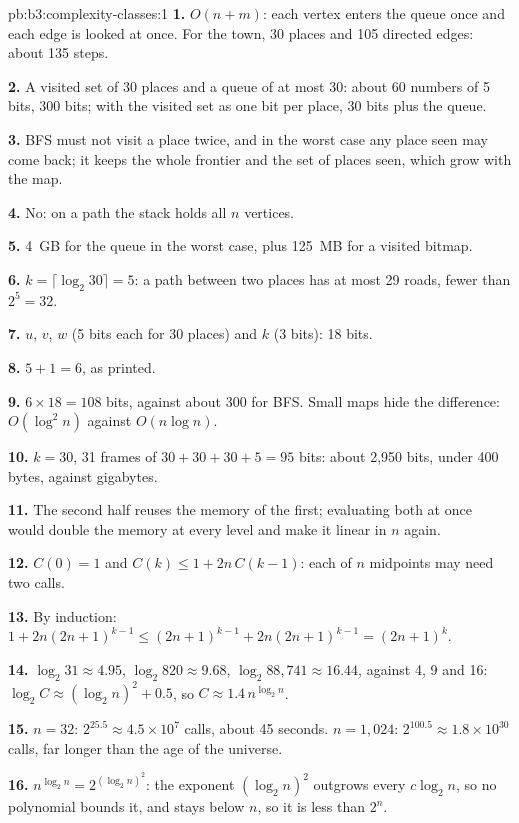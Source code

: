 \begin{solution}{pb:b3:complexity-classes:1}
\textbf{1.} $O(n + m)$: each vertex enters the queue once and each edge is looked at once. For the town, 30 places and 105 directed edges: about 135 steps.

\textbf{2.} A visited set of 30 places and a queue of at most 30: about 60 numbers of 5 bits, 300 bits; with the visited set as one bit per place, 30 bits plus the queue.

\textbf{3.} BFS must not visit a place twice, and in the worst case any place seen may come back; it keeps the whole frontier and the set of places seen, which grow with the map.

\textbf{4.} No: on a path the stack holds all $n$ vertices.

\textbf{5.} 4~GB for the queue in the worst case, plus 125~MB for a visited bitmap.

\textbf{6.} $k = \lceil \log_2 30 \rceil = 5$: a path between two places has at most 29 roads, fewer than $2^5 = 32$.

\textbf{7.} $u$, $v$, $w$ (5 bits each for 30 places) and $k$ (3 bits): 18 bits.

\textbf{8.} $5 + 1 = 6$, as printed.

\textbf{9.} $6 \times 18 = 108$ bits, against about 300 for BFS. Small maps hide the difference: $O(\log^2 n)$ against $O(n \log n)$.

\textbf{10.} $k = 30$, 31 frames of $30 + 30 + 30 + 5 = 95$ bits: about 2,950 bits, under 400 bytes, against gigabytes.

\textbf{11.} The second half reuses the memory of the first; evaluating both at once would double the memory at every level and make it linear in $n$ again.

\textbf{12.} $C(0) = 1$ and $C(k) \le 1 + 2n\,C(k - 1)$: each of $n$ midpoints may need two calls.

\textbf{13.} By induction: $1 + 2n(2n + 1)^{k - 1} \le (2n + 1)^{k - 1} + 2n(2n + 1)^{k - 1} = (2n + 1)^k$.

\textbf{14.} $\log_2 31 \approx 4.95$, $\log_2 820 \approx 9.68$, $\log_2 88{,}741 \approx 16.44$, against 4, 9 and 16: $\log_2 C \approx (\log_2 n)^2 + 0.5$, so $C \approx 1.4 \, n^{\log_2 n}$.

\textbf{15.} $n = 32$: $2^{25.5} \approx 4.5 \times 10^7$ calls, about 45 seconds. $n = 1{,}024$: $2^{100.5} \approx 1.8 \times 10^{30}$ calls, far longer than the age of the universe.

\textbf{16.} $n^{\log_2 n} = 2^{(\log_2 n)^2}$: the exponent $(\log_2 n)^2$ outgrows every $c \log_2 n$, so no polynomial bounds it, and stays below $n$, so it is less than $2^n$.


\end{solution}
